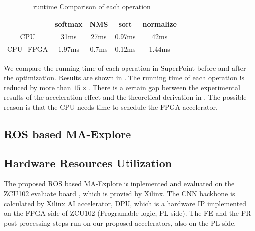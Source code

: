 \begin{table}[t]
  \centering
  \caption{runtime Comparison of each operation}
\begin{tabular}{|c|c|c|c|c|}
  \hline
             &    softmax &        NMS &       sort &  normalize \bigstrut\\
  \hline
         CPU &       31ms &       27ms &       0.97ms &       42ms \bigstrut\\
  \hline
    CPU+FPGA &     1.97ms &      0.7ms &     0.12ms &     1.44ms \bigstrut\\
  \hline
  \end{tabular}  
  
  \label{tab:optimization}%
\end{table}%

We compare the running time of each operation in SuperPoint before and after the optimization. Results are shown in . The running time of each operation is reduced by more than $15\times$. There is a certain gap between the experimental results of the acceleration effect and the theoretical derivation in . The possible reason is that the CPU needs time to schedule the FPGA accelerator.

\subsection{ ROS based MA-Explore }

\subsection {Hardware Resources Utilization}

The proposed ROS based MA-Explore is inplemented and evaluated on the ZCU102 evaluate board \cite{zcu102}, which is provied by Xilinx. The CNN backbone is calculated by Xilinx AI accelerator, DPU\cite{dpu}, which is a hardware IP implemented on the FPGA side of ZCU102 (Programable logic, PL side). The FE and the PR post-processing steps run on our proposed accelerators, also on the PL side.

